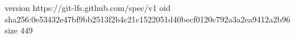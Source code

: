 version https://git-lfs.github.com/spec/v1
oid sha256:0e53432e47bf9bb2513f2b4c21c1522051d40becf0120c792a3a2ea9412a2b96
size 449
